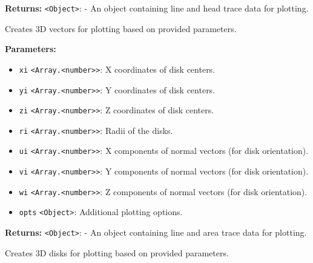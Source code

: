 \documentclass[12pt,a4paper]{article}
\begin{document}
\noindent \textbf{Returns:} \texttt{<Object>}: - An object containing line and head trace data for plotting.

\noindent Creates 3D vectors for plotting based on provided parameters.

\vspace{5mm}
\noindent {}


\noindent \textbf{Parameters:}
\begin{itemize}
  \item \texttt{xi} \texttt{<Array.<number>>}: X coordinates of disk centers.
  \item \texttt{yi} \texttt{<Array.<number>>}: Y coordinates of disk centers.
  \item \texttt{zi} \texttt{<Array.<number>>}: Z coordinates of disk centers.
  \item \texttt{ri} \texttt{<Array.<number>>}: Radii of the disks.
  \item \texttt{ui} \texttt{<Array.<number>>}: X components of normal vectors (for disk orientation).
  \item \texttt{vi} \texttt{<Array.<number>>}: Y components of normal vectors (for disk orientation).
  \item \texttt{wi} \texttt{<Array.<number>>}: Z components of normal vectors (for disk orientation).
  \item \texttt{opts} \texttt{<Object>}: Additional plotting options.
\end{itemize}

\noindent \textbf{Returns:} \texttt{<Object>}: - An object containing line and area trace data for plotting.

\noindent Creates 3D disks for plotting based on provided parameters.

\vspace{5mm}
\noindent {}
\end{document}
